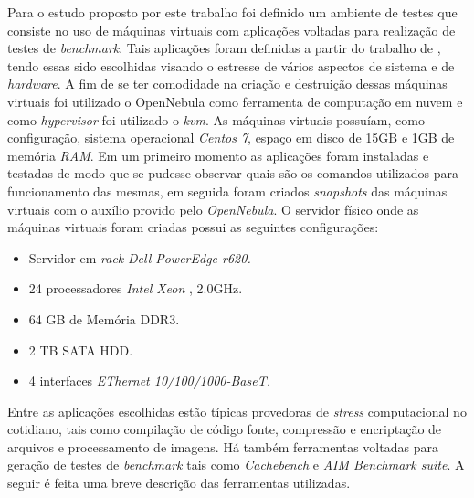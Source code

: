 \documentclass[[10pt,journal]{IEEEtran}
\begin{document}
Para o estudo proposto por este trabalho foi definido um  ambiente de testes que consiste no uso de máquinas virtuais com aplicações voltadas para realização
de testes de \textit{benchmark}. Tais aplicações foram definidas a partir do trabalho de \cite{koh2007}, tendo essas sido escolhidas visando o estresse de vários aspectos de sistema e de \textit{hardware}. A fim de se ter comodidade na criação e destruição dessas máquinas virtuais foi utilizado o OpenNebula como ferramenta de computação em nuvem e como \textit{hypervisor} foi utilizado o \textit{kvm}. As máquinas virtuais possuíam, como configuração, sistema operacional \textit{Centos 7}, espaço em disco de 15GB e 1GB de memória \textit{RAM}. Em um primeiro momento as aplicações foram instaladas e testadas de modo que se pudesse observar quais são os comandos utilizados para funcionamento das mesmas, em seguida foram criados \textit{snapshots} das máquinas virtuais com o auxílio provido pelo \textit{OpenNebula}. O servidor físico onde as máquinas virtuais foram criadas possui as seguintes configurações:
\begin{itemize}
	\item Servidor em \textit{rack} \textit{Dell PowerEdge r620.}
	\item 24 processadores \textit{Intel Xeon }, 2.0GHz.
	\item 64 GB de Memória DDR3.
	\item 2 TB SATA HDD.
	\item 4 interfaces \textit{EThernet 10/100/1000-BaseT.}
\end{itemize} 

Entre as aplicações escolhidas estão típicas provedoras de \textit{stress} computacional no cotidiano, tais como compilação de código fonte, compressão e encriptação de arquivos e processamento de imagens. Há também ferramentas voltadas para geração de testes de \textit{benchmark} tais como \textit{Cachebench} e \textit{AIM Benchmark suite}. A seguir é feita uma breve descrição das ferramentas utilizadas.
\end{document}
